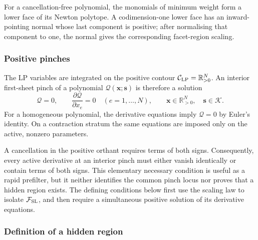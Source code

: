 \documentclass[a4paper,11pt]{article}
\newcommand{\x}{\boldsymbol{x}}
\newcommand{\s}{\boldsymbol{s}}
\newcommand{\K}{\mathcal K}
\newcommand{\FSL}{\mathcal F_{\rm SL}}
\begin{document}
For a cancellation-free polynomial, the monomials of minimum weight form a
lower face of its Newton polytope.  A codimension-one lower face has an
inward-pointing normal whose last component is positive; after normalising
that component to one, the normal gives the corresponding facet-region
scaling.

\subsubsection{Positive pinches}
\label{sec:pinch}

The LP variables are integrated on the positive contour
\(\mathcal C_{\rm LP}=\mathbb R_{>0}^{N}\).  An interior first-sheet pinch of
a polynomial \(\mathcal Q(\x;\s)\) is therefore a solution
\begin{equation}
 \mathcal Q=0,
 \qquad
 \frac{\partial\mathcal Q}{\partial x_e}=0
 \quad(e=1,\ldots,N),
 \qquad
 \x\in\mathbb R_{>0}^{N},\quad \s\in\K.
\label{eq:positive-pinch}
\end{equation}
For a homogeneous polynomial, the derivative equations imply
\(\mathcal Q=0\) by Euler's identity.  On a contraction stratum the same
equations are imposed only on the active, nonzero parameters.

A cancellation in the positive orthant requires terms of both signs.
Consequently, every active derivative at an interior pinch must either vanish
identically or contain terms of both signs.  This elementary necessary
condition is useful as a rapid prefilter, but it neither identifies the
common pinch locus nor proves that a hidden region exists.  The defining
conditions below first use the scaling law to isolate \(\FSL\), and then
require a simultaneous positive solution of its derivative equations.

\subsubsection{Definition of a hidden region}
\label{sec:definition}
\end{document}
